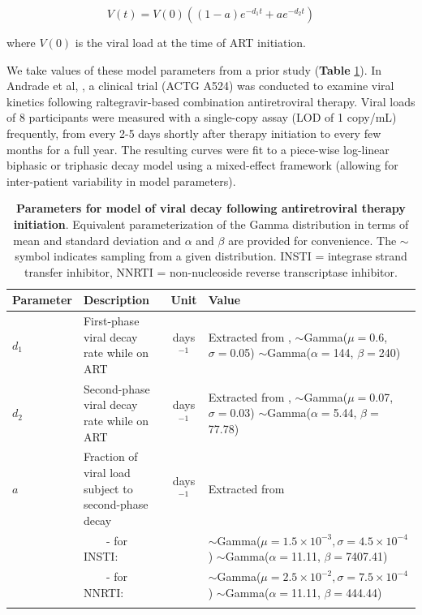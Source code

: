 \documentclass{article}[11pt]
\begin{document}
\begin{equation}
    V(t) = V(0) \left( (1-a) e^{-d_1 t} + a e^{-d_2 t}\right)
\label{eq:vl_decay}
\end{equation}

where $V(0)$ is the viral load at the time of ART initiation. 

We take values of these model parameters from a prior study (\textbf{Table} \ref{table:viral_decay}). In Andrade et al, \cite{andrade2013}, a clinical trial (ACTG A524) was conducted to examine viral kinetics following raltegravir-based combination antiretroviral therapy. Viral loads of 8 participants were measured with a single-copy assay (LOD of 1 copy/mL) frequently, from every 2-5 days shortly after therapy initiation to every few months for a full year. The resulting curves were fit to a piece-wise log-linear biphasic or triphasic decay model using a mixed-effect framework (allowing for inter-patient variability in model parameters). 

\begin{table}[ht]
\centering
\caption{\textbf{Parameters for model of viral decay following antiretroviral therapy initiation}. Equivalent parameterization of the Gamma distribution in terms of mean and standard deviation and $\alpha$ and $\beta$ are provided for convenience. The $\sim$ symbol indicates sampling from a given distribution. INSTI = integrase strand transfer inhibitor, NNRTI = non-nucleoside reverse transcriptase inhibitor. }
\begin{tabular}{p{}p{}cp{}}
 \toprule
\textbf{Parameter} & \textbf{Description} & \textbf{Unit} & \textbf{Value} \\
\midrule
$d_1$ & First-phase viral decay rate while on ART & days$^{-1}$ & Extracted from \cite{andrade2013}, \newline $\sim$Gamma($\mu=$0.6, $\sigma=$0.05) \newline $\sim$Gamma($\alpha=$144, $\beta=$240) \\
$d_2$ & Second-phase viral decay rate while on ART & days$^{-1}$ & Extracted from \cite{andrade2013}, \newline $\sim$Gamma($\mu=$0.07, $\sigma=$0.03) \newline $\sim$Gamma($\alpha=$5.44, $\beta=$77.78) \\
$a$ & Fraction of viral load subject to second-phase decay & days$^{-1}$ & Extracted from \cite{andrade2013} \\
& $\qquad$- for INSTI: & &
$\sim$Gamma($\mu=1.5 \times 10^{-3}, \sigma=4.5 \times 10^{-4}$) \newline $\sim$Gamma($\alpha=$11.11, $\beta=$7407.41) \\
& $\qquad$- for NNRTI: & &
$\sim$Gamma($\mu=2.5 \times 10^{-2}, \sigma=7.5 \times 10^{-4}$) \newline
$\sim$Gamma($\alpha=$11.11, $\beta=$444.44) \\
\bottomrule
\label{table:viral_decay}
\end{tabular}
\end{table}
\end{document}
